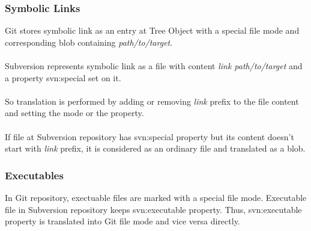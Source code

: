 \begin{center}
\begin{tabular}{ | p{} | p{} | p{} | p{} |}
\end{tabular}
\label{eol_mime_git_to_svn}
\end{center}

\subsubsection{Symbolic Links}
Git stores symbolic link as an entry at Tree Object with a special file mode and corresponding blob containing \emph{path/to/target}.
\\\\
Subversion represents symbolic link as a file with content \emph{link path/to/target} and a property svn:special set on it.
\\\\
So translation is performed by adding or removing \emph{link } prefix to the file content and setting the mode or the property.
\\\\
If file at Subversion repository has svn:special property but its content doesn't start with \emph{link } prefix, it is considered as an ordinary file and translated as a blob.

\subsubsection{Executables}
In Git repository, exectuable files are marked with a special file mode. Executable file in Subversion repository keeps svn:executable property. 
Thus, svn:executable property is translated into Git file mode and vice versa directly.

